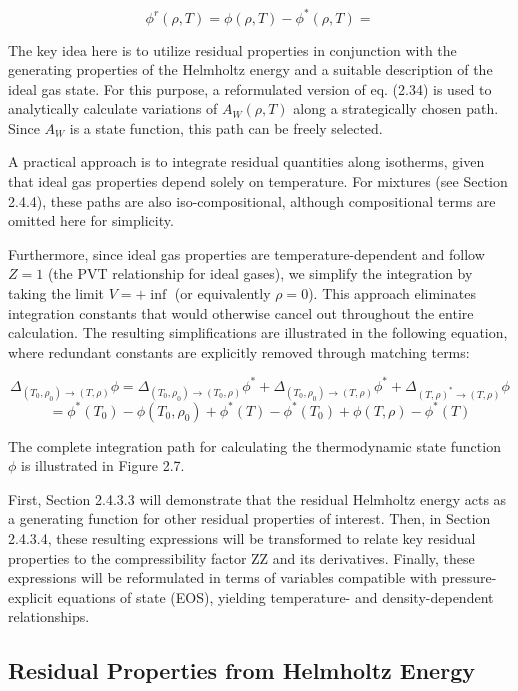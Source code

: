 \begin{equation}
	\phi^r(\rho, T) = \phi(\rho, T) - \phi^*(\rho, T) = 
\end{equation}

The key idea here is to utilize residual properties in conjunction with the
generating properties of the Helmholtz energy and a suitable description of the
ideal gas state. For this purpose, a reformulated version of eq. (2.34) is used
to analytically calculate variations of $A_W(\rho,T)$ along a strategically
chosen path. Since $A_W$ is a state function, this path can be freely selected.

A practical approach is to integrate residual quantities along isotherms, given
that ideal gas properties depend solely on temperature. For mixtures (see
Section 2.4.4), these paths are also iso-compositional, although compositional
terms are omitted here for simplicity.

Furthermore, since ideal gas properties are temperature-dependent and follow
$Z=1$ (the PVT relationship for ideal gases), we simplify the integration by
taking the limit $V=+\inf$ (or equivalently $\rho=0$). This approach eliminates
integration constants that would otherwise cancel out throughout the entire
calculation. The resulting simplifications are illustrated in the following
equation, where redundant constants are explicitly removed through matching
terms:

\[
\Delta_{(T_0, \rho_0) \rightarrow (T, \rho)} \phi = \Delta_{(T_0, \rho_0) \rightarrow (T_0, \rho)} \phi^* + \Delta_{(T_0, \rho_0) \rightarrow (T, \rho)} \phi^* + \Delta_{(T, \rho)^* \rightarrow (T, \rho)} \phi
\]
\[
= \phi^*(T_0) - \phi(T_0, \rho_0) + \phi^*(T) - \phi^*(T_0) + \phi(T, \rho) - \phi^*(T)
\]

The complete integration path for calculating the thermodynamic state function
$\phi$ is illustrated in Figure 2.7.

First, Section 2.4.3.3 will demonstrate that the residual Helmholtz energy acts
as a generating function for other residual properties of interest. Then, in
Section 2.4.3.4, these resulting expressions will be transformed to relate key
residual properties to the compressibility factor ZZ and its derivatives.
Finally, these expressions will be reformulated in terms of variables compatible
with pressure-explicit equations of state (EOS), yielding temperature- and
density-dependent relationships.

\subsection{Residual Properties from Helmholtz Energy}

